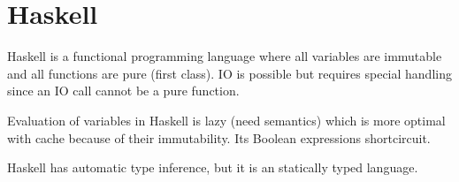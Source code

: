 \section{Haskell}
Haskell is a functional programming language where all variables are
immutable and all functions are pure (first class). IO is possible but
requires special handling since an IO call cannot be a pure function.

Evaluation of variables in Haskell is lazy (need semantics) which is
more optimal with cache because of their immutability. Its Boolean
expressions shortcircuit.

Haskell has automatic type inference, but it is an statically typed
language.